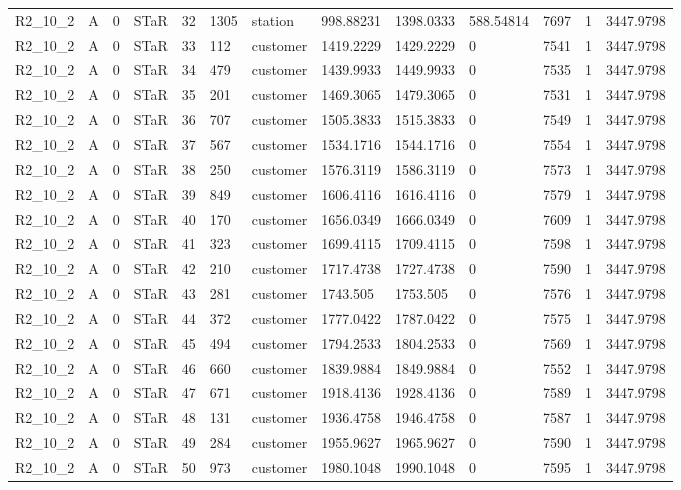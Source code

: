 \begin{longtable}{lllllllllllll}
R2\_10\_2 & A & 0 & STaR & 32 & 1305 & station & 998.88231 & 1398.0333 & 588.54814 & 7697 & 1 & 3447.9798 \\
R2\_10\_2 & A & 0 & STaR & 33 & 112 & customer & 1419.2229 & 1429.2229 & 0 & 7541 & 1 & 3447.9798 \\
R2\_10\_2 & A & 0 & STaR & 34 & 479 & customer & 1439.9933 & 1449.9933 & 0 & 7535 & 1 & 3447.9798 \\
R2\_10\_2 & A & 0 & STaR & 35 & 201 & customer & 1469.3065 & 1479.3065 & 0 & 7531 & 1 & 3447.9798 \\
R2\_10\_2 & A & 0 & STaR & 36 & 707 & customer & 1505.3833 & 1515.3833 & 0 & 7549 & 1 & 3447.9798 \\
R2\_10\_2 & A & 0 & STaR & 37 & 567 & customer & 1534.1716 & 1544.1716 & 0 & 7554 & 1 & 3447.9798 \\
R2\_10\_2 & A & 0 & STaR & 38 & 250 & customer & 1576.3119 & 1586.3119 & 0 & 7573 & 1 & 3447.9798 \\
R2\_10\_2 & A & 0 & STaR & 39 & 849 & customer & 1606.4116 & 1616.4116 & 0 & 7579 & 1 & 3447.9798 \\
R2\_10\_2 & A & 0 & STaR & 40 & 170 & customer & 1656.0349 & 1666.0349 & 0 & 7609 & 1 & 3447.9798 \\
R2\_10\_2 & A & 0 & STaR & 41 & 323 & customer & 1699.4115 & 1709.4115 & 0 & 7598 & 1 & 3447.9798 \\
R2\_10\_2 & A & 0 & STaR & 42 & 210 & customer & 1717.4738 & 1727.4738 & 0 & 7590 & 1 & 3447.9798 \\
R2\_10\_2 & A & 0 & STaR & 43 & 281 & customer & 1743.505 & 1753.505 & 0 & 7576 & 1 & 3447.9798 \\
R2\_10\_2 & A & 0 & STaR & 44 & 372 & customer & 1777.0422 & 1787.0422 & 0 & 7575 & 1 & 3447.9798 \\
R2\_10\_2 & A & 0 & STaR & 45 & 494 & customer & 1794.2533 & 1804.2533 & 0 & 7569 & 1 & 3447.9798 \\
R2\_10\_2 & A & 0 & STaR & 46 & 660 & customer & 1839.9884 & 1849.9884 & 0 & 7552 & 1 & 3447.9798 \\
R2\_10\_2 & A & 0 & STaR & 47 & 671 & customer & 1918.4136 & 1928.4136 & 0 & 7589 & 1 & 3447.9798 \\
R2\_10\_2 & A & 0 & STaR & 48 & 131 & customer & 1936.4758 & 1946.4758 & 0 & 7587 & 1 & 3447.9798 \\
R2\_10\_2 & A & 0 & STaR & 49 & 284 & customer & 1955.9627 & 1965.9627 & 0 & 7590 & 1 & 3447.9798 \\
R2\_10\_2 & A & 0 & STaR & 50 & 973 & customer & 1980.1048 & 1990.1048 & 0 & 7595 & 1 & 3447.9798 \\

\end{longtable}
